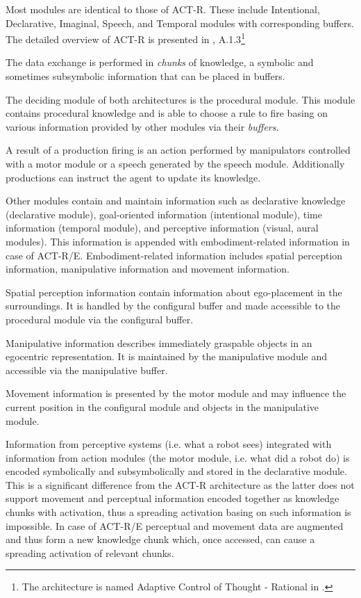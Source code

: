 \documentclass[10pt]{article}
\begin{document}
Most modules are identical to those of ACT-R. These include Intentional, Declarative, Imaginal, Speech, and Temporal modules with corresponding buffers. The detailed overview of ACT-R is presented in \cite{cosmos}, A.1.3\footnote{The architecture is named Adaptive Control of Thought - Rational in \cite{cosmos}.}

The data exchange is performed in \emph{chunks} of knowledge, a symbolic and sometimes subsymbolic information that can be placed in buffers.

The deciding module of both architectures is the procedural module. This module contains procedural knowledge and is able to choose a rule to fire basing on various information provided by other modules via their \emph{buffers}. 

A result of a production firing is an action performed by manipulators controlled with a motor module or a speech generated by the speech module. Additionally productions can instruct the agent to update its knowledge.

Other modules contain and maintain information such as declarative knowledge (declarative module), goal-oriented information (intentional module), time information (temporal module), and perceptive information (visual, aural modules). This information is appended with embodiment-related information in case of ACT-R/E. Embodiment-related information includes spatial perception information, manipulative information and movement information.

Spatial perception information contain information about ego-placement in the surroundings. It is handled by the configural buffer and made accessible to the procedural module via the configural buffer.

Manipulative information describes immediately graspable objects in an egocentric representation. It is maintained by the manipulative module and accessible via the manipulative buffer.

Movement information is presented by the motor module and may influence the current position in the configural module and objects in the manipulative module. 

Information from perceptive systems (i.e. what a robot sees) integrated with information from action modules (the motor module, i.e. what did a robot do) is encoded symbolically and subsymbolically and stored in the declarative module. This is a significant difference from the ACT-R architecture as the latter does not support movement and perceptual information encoded together as knowledge chunks with activation, thus a spreading activation basing on such information is impossible. In case of ACT-R/E perceptual and movement data are augmented and thus form a new knowledge chunk which, once accessed, can cause a spreading activation of relevant chunks.
\end{document}
